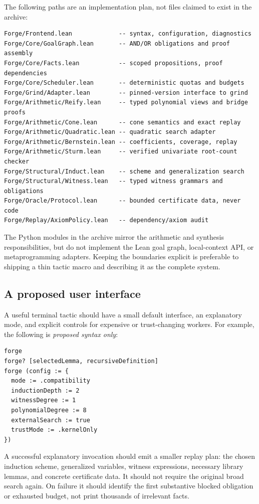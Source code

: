 The following paths are an implementation plan, not files claimed to exist in the archive:

\begin{lstlisting}
Forge/Frontend.lean             -- syntax, configuration, diagnostics
Forge/Core/GoalGraph.lean       -- AND/OR obligations and proof assembly
Forge/Core/Facts.lean           -- scoped propositions, proof dependencies
Forge/Core/Scheduler.lean       -- deterministic quotas and budgets
Forge/Grind/Adapter.lean        -- pinned-version interface to grind
Forge/Arithmetic/Reify.lean     -- typed polynomial views and bridge proofs
Forge/Arithmetic/Cone.lean      -- cone semantics and exact replay
Forge/Arithmetic/Quadratic.lean -- quadratic search adapter
Forge/Arithmetic/Bernstein.lean -- coefficients, coverage, replay
Forge/Arithmetic/Sturm.lean     -- verified univariate root-count checker
Forge/Structural/Induct.lean    -- scheme and generalization search
Forge/Structural/Witness.lean   -- typed witness grammars and obligations
Forge/Oracle/Protocol.lean      -- bounded certificate data, never code
Forge/Replay/AxiomPolicy.lean   -- dependency/axiom audit
\end{lstlisting}

The Python modules in the archive mirror the arithmetic and synthesis responsibilities, but do not implement the Lean goal graph, local-context API, or metaprogramming adapters. Keeping the boundaries explicit is preferable to shipping a thin tactic macro and describing it as the complete system.

\subsection{A proposed user interface}

A useful terminal tactic should have a small default interface, an explanatory mode, and explicit controls for expensive or trust-changing workers. For example, the following is \emph{proposed syntax only}:

\begin{lstlisting}
forge
forge? [selectedLemma, recursiveDefinition]
forge (config := {
  mode := .compatibility
  inductionDepth := 2
  witnessDegree := 1
  polynomialDegree := 8
  externalSearch := true
  trustMode := .kernelOnly
})
\end{lstlisting}

A successful explanatory invocation should emit a smaller replay plan: the chosen induction scheme, generalized variables, witness expressions, necessary library lemmas, and concrete certificate data. It should not require the original broad search again. On failure it should identify the first substantive blocked obligation or exhausted budget, not print thousands of irrelevant facts.

